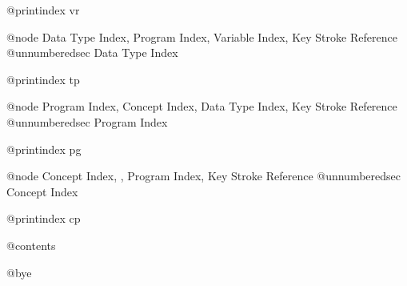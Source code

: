 @printindex vr

@node Data Type Index, Program Index, Variable Index, Key Stroke Reference
@unnumberedsec Data Type Index

@printindex tp

@node Program Index, Concept Index, Data Type Index, Key Stroke Reference
@unnumberedsec Program Index

@printindex pg

@node Concept Index,  , Program Index, Key Stroke Reference
@unnumberedsec Concept Index

@printindex cp


@contents

@bye
                                   

